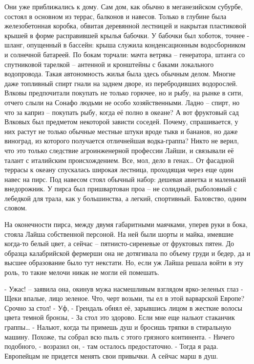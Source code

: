 \documentclass{book}
\begin{document}
Они уже приближались к дому. Сам дом, как обычно в меганезийском субурбе, состоял в основном из террас, балконов и навесов. Только в глубине была железобетонная коробка, обвитая деревянной лестницей и накрытая пластиковой крышей в форме расправившей крылья бабочки. У бабочки был хоботок, точнее - шланг, опущенный в бассейн: крыша служила конденсационным водосборником и солнечной батареей. По бокам торчали: мачта ветряка -- генератора, штанга со спутниковой тарелкой -- антенной и кронштейны с баками локального водопровода. Такая автономность жилья была здесь обычным делом. Многие даже топливный спирт гнали на заднем дворе, из перебродивших водорослей. Влковы предпочитали покупать не только горючее, но и рыбу, на рынке в сити, отчего слыли на Сонафо людьми не особо хозяйственными. Ладно -- спирт, но что за каприз -- покупать рыбу, когда её полно в океане? А вот фруктовый сад Влковых был предметом некоторой зависти соседей. Почему, спрашивается, у них растут не только обычные местные штуки вроде тыкв и бананов, но даже виноград, из которого получается отличнейшая водка-граппа? Никто не верил, что это только следствие агроинженерной профессии Лайши, и связывали её талант с италийским происхождением. Все, мол, дело в генах\ldots{} От фасадной террасы к океану спускалась широкая лестница, проходящая через еще один навес на пирс. Под навесом стоял обычный набор: дешевая авиетка и маленький внедорожник. У пирса был пришвартован проа -- не солидный, рыболовный с лебедкой для трала, как у большинства, а легкий, спортивный. Баловство, одним словом.

На оконечности пирса, между двумя габаритными маячками, уперев руки в бока, стояла Лайша собственной персоной. На ней были шорты и майка, имевшие когда-то белый цвет, а сейчас -- пятнисто-сиреневые от фруктовых пятен. До образца калабрийской фермерши она не дотягивала по объему груди и бедер, да и высшее образование было тут некстати. Но, если уж Лайша решала войти в эту роль, то такие мелочи никак не могли ей помешать.

- Ужас! -- заявила она, окинув мужа насмешливым взглядом ярко-зеленых глаз - Щеки впалые, лицо зеленое. Что, черт возьми, ты ел в этой варварской Европе? Срочно за стол!
- Уф, - Грендаль обнял её, зарывшись лицом в жесткие волосы цвета темной бронзы, - За стол это здорово. Если мне еще нальют стаканчик граппы\ldots{}
- Нальют, когда ты примешь душ и бросишь тряпки в стиральную машину. Похоже, ты собрал всю пыль с этого грязного континента.
- Ничего подобного, - возразил он, - там осталось предостаточно.
- Тогда я рада. Европейцам не придется менять свои привычки. А сейчас марш в душ.
\end{document}
